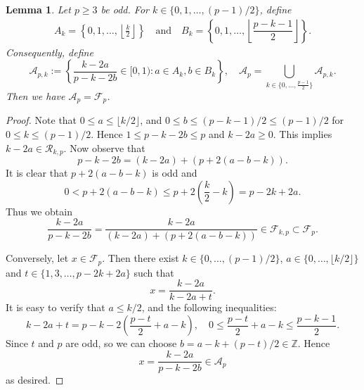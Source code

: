 \documentclass[12pt, reqno]{amsart}
\theoremstyle{plain}
\newtheorem{lemma}[theorem]{Lemma}
\theoremstyle{definition}
\begin{document}
\begin{lemma}\label{l3.7}
    Let $p\geq3$ be odd. For $k\in\{0, 1, \ldots, (p-1)/2\}$, define
    \begin{align*}
        A_k = \left\{0, 1, \ldots, \left\lfloor\frac{k}{2}\right\rfloor\right\}
        \quad\text{and}\quad
        B_k =\left\{0, 1, \ldots, \left\lfloor\dfrac{p-k-1}{2}\right\rfloor\right\}.
    \end{align*}
    Consequently, define %
    \[\mathcal{A}_{p, k}:=\left\{\frac{k-2a}{p-k-2b}\in[0,1) :  a\in A_k, b\in B_k\right\},\quad \mathcal{A}_p=\bigcup_{k\in\{0, \ldots, \frac{p-1}{2}\}}\mathcal{A}_{p, k}.\]
    Then we have $\mathcal{A}_p=\mathcal{F}_p$.
\end{lemma}
    \begin{proof}
    Note that $0\leq a\leq\lfloor k/2\rfloor$, and $0\leq b\leq(p-k-1)/2\leq(p-1)/2$ for $0\leq k\leq (p-1)/2$. Hence
    $1\leq p-k-2b\leq p$ {and}  $k-2a\geq0$.
    This implies $k-2a\in\mathcal{R}_{k,p}$. Now observe that \[p-k-2b=(k-2a)+(p+2(a-b-k)).\]
    It is clear that $p+2(a-b-k)$ is odd and
        \[0< p+2(a-b-k)\leq p+2\left(\frac{k}{2}-k\right)=p-2k+2a.\]
    Thus we obtain
    \[\frac{k-2a}{p-k-2b}=\frac{k-2a}{(k-2a)+(p+2(a-b-k))}\in\mathcal{F}_{k,p}\subset\mathcal{F}_p.\]

    Conversely, let $x\in\mathcal{F}_p$. Then there exist $k\in\{0,\ldots,(p-1)/2\}$, $a\in\{0,\ldots,\lfloor k/2\rfloor\}$ and $t\in\{1,3,\ldots,p-2k+2a\}$ such that
    \[x=\frac{k-2a}{k-2a+t}.\]
    It is easy to verify that $a\leq k/2$, and the following inequalities:
    \[k-2a+t=p-k-2\left(\frac{p-t}{2}+a-k\right),\quad 0\leq\frac{p-t}{2}+a-k\leq\frac{p-k-1}{2}.\]
    Since $t$ and $p$ are odd, so we can choose $b=a-k+(p-t)/2\in\mathbb{Z}$. Hence
    \[x=\frac{k-2a}{p-k-2b}\in\mathcal{A}_p\]
    as desired.
\end{proof}
\end{document}
